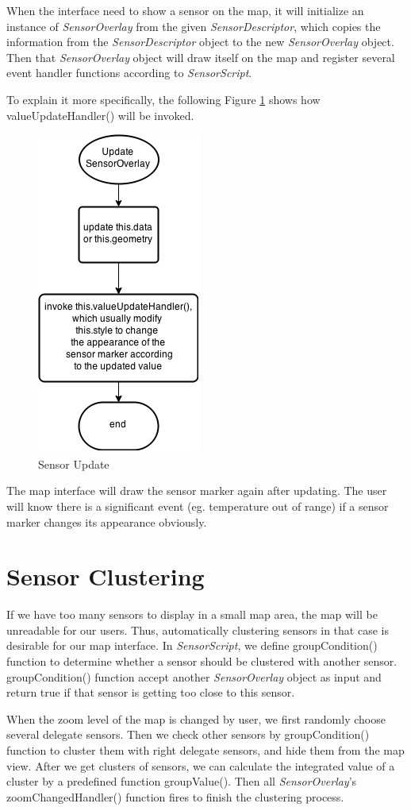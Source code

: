 \documentclass{article}
\begin{document}
When the interface need to show a sensor on the map, it will initialize an instance of \textit{SensorOverlay} from the given \textit{SensorDescriptor}, which copies the information from the \textit{SensorDescriptor} object to the new \textit{SensorOverlay} object. Then that \textit{SensorOverlay} object will draw itself on the map and register several event handler functions according to \textit{SensorScript}. 

To explain it more specifically, the following Figure \ref{fig:sensorupdate} shows how valueUpdateHandler() will be invoked.

\begin{figure}[htb]
\centering
\includegraphics[width=0.2\columnwidth]{update.png}
\caption{Sensor Update}\label{fig:sensorupdate}
\end{figure}

The map interface will draw the sensor marker again after updating. The user will know there is a significant event (eg. temperature out of range) if a sensor marker changes its appearance obviously.



\section{Sensor Clustering}

If we have too many sensors to display in a small map area, the map will be unreadable for our users. Thus, automatically clustering sensors in that case is desirable for our map interface\cite{coleman1998clustering}. In \textit{SensorScript}, we define groupCondition() function to determine whether a sensor should be clustered with another sensor. groupCondition() function accept another \textit{SensorOverlay} object as input and return true if that sensor is getting too close to this sensor. 

When the zoom level of the map is changed by user, we first randomly choose several delegate sensors. Then we check other sensors by groupCondition() function to cluster them with right delegate sensors, and hide them from the map view. After we get clusters of sensors, we can calculate the integrated value of a cluster by a predefined function groupValue(). Then all \textit{SensorOverlay}'s zoomChangedHandler() function fires to finish the clustering process.
\end{document}
